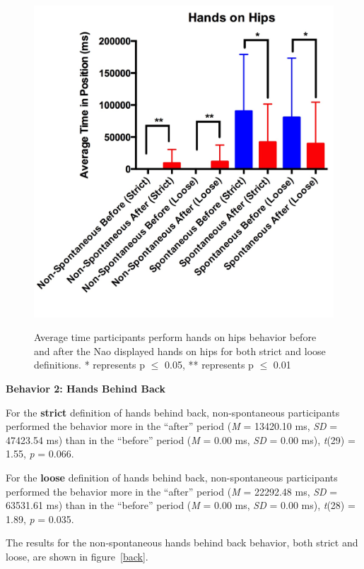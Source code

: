 \documentclass{acm_proc_article-sp}
\begin{document}
\begin{figure}[t!]
\centering
 \includegraphics[width=1.00\linewidth]{images/hips.jpg}\\
 \caption{Average time participants perform hands on hips behavior before and after the Nao displayed hands on hips for both strict and loose definitions. * represents p $\le$ 0.05, ** represents p $\le$ 0.01} 
 \label{hips} %
\end{figure}

\textbf{Behavior 2: Hands Behind Back}

For the \textbf{strict} definition of hands behind back, non-spontaneous participants performed the behavior more in the ``after'' period (\textit{M} = 13420.10 ms, \textit{SD} = 47423.54 ms) than in the ``before'' period (\textit{M} = 0.00 ms, \textit{SD} = 0.00 ms), \textit{t}(29) = 1.55, \textit{p} = 0.066.

For the \textbf{loose} definition of hands behind back, non-spontaneous participants performed the behavior more in the ``after'' period (\textit{M} = 22292.48 ms, \textit{SD} = 63531.61 ms) than in the ``before'' period (\textit{M} = 0.00 ms, \textit{SD} = 0.00 ms), \textit{t}(28) = 1.89, \textit{p} = 0.035.

The results for the non-spontaneous hands behind back behavior, both strict and loose, are shown in figure~\ref{back}.
\end{document}
